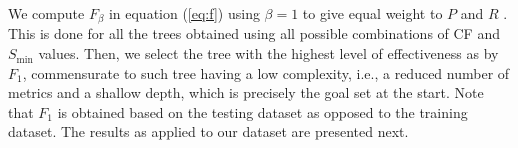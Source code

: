 We compute $F_{\beta}$ in equation (\ref{eq:f}) using $\beta = 1$ to give equal weight to $P$ and $R$ \citep{McCarthy_1995_Proc}. This is done for all the trees obtained using all possible combinations of CF and $S_{\min}$ values. Then, we select the tree with the highest level of effectiveness as  by $F_1$, commensurate to such tree having a low complexity, i.e., a reduced number of metrics and a shallow depth, which is precisely the goal set at the start. Note that $F_1$ is obtained based on the testing dataset as opposed to the training dataset. The results as applied to our dataset are presented next.
